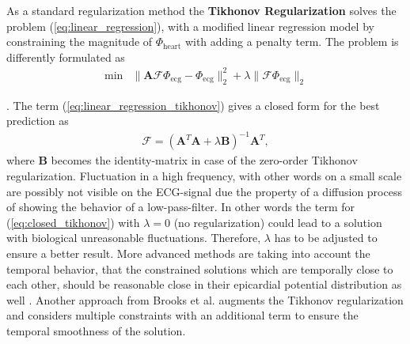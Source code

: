 
As a standard regularization method the \textbf{Tikhonov Regularization}\cite[p. 126]{willoughby_solutions_1979} solves the problem (\ref{eq:linear_regression}), with a modified linear regression model by constraining the magnitude of $\varPhi_{\text{heart}}$ with adding a penalty term. The problem is differently formulated as 
\begin{align}
    \label{eq:linear_regression_tikhonov}
    \min&\parallel\textbf{A}\mathcal{F}\varPhi_{\text{ecg}}-\varPhi_{\text{ecg}}\parallel_2^2+\lambda\parallel\mathcal{F}\varPhi_{\text{ecg}}\parallel_2
\end{align}

\cite{ito_inverse_2015}. 
The term (\ref{eq:linear_regression_tikhonov}) gives a closed form for the best prediction as
\begin{align}
    \label{eq:closed_tikhonov}
    \mathcal{F}=(\textbf{A}^T\textbf{A}+\lambda\textbf{B})^{-1}\textbf{A}^T,
\end{align}
where $\textbf{B}$ becomes the identity-matrix in case of the zero-order Tikhonov regularization. Fluctuation in a high frequency, with other words on a small scale are possibly not visible on the ECG-signal due the property of a diffusion process of showing the behavior of a low-pass-filter. In other words the term for (\ref{eq:closed_tikhonov}) with $\lambda=0$ (no regularization) could lead to a solution with biological unreasonable fluctuations. Therefore, $\lambda$ has to be adjusted to ensure a better result.
More advanced methods are taking into account the temporal behavior, that the constrained solutions which are temporally close to each other, should be reasonable close in their epicardial potential distribution as well \cite{oster_use_1992}\cite{time_space_1995}. Another approach from Brooks et al. \cite{brooks_augmented_1993} augments the Tikhonov regularization and considers multiple constraints with an additional term to ensure the temporal smoothness of the solution. 

